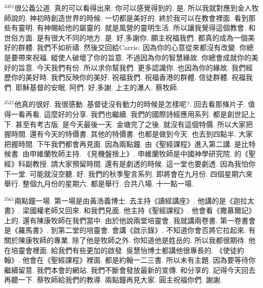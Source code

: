\documentclass{book}
\begin{document}
$^{3481}$很公義公道.
真的可以看得出來.
你可以感覺得到的.
是.
所以我就對應到金人牧師說的.
神初時創造世界的時候.
一切都是美好的.
終於我可以在教會裡面.
看到那些有靈明.
有神賜給他的屬靈的.
就是風營的靈明生活.
所以讓我覺得這個教會.
和世俗方面.
是有很大不同的地方.
是.
好,多謝你.
願主祝福我們.
都真的成為一個美好的群體.
我們不如祈禱.
然後交回給Carrie.
因為你的心意從來都沒有改變.
你總是要帶來祝福.
縱使人破壞了你的旨意.
不過因為你的智慧緣故.
你總會成就你的美好的旨意.
今天我們有份.
所以求你幫我們.
更多認識你.
也因為你的緣故.
我們經歷你的美好時.
我們反映你的美好.
祝福我們.
祝福香港的群體.
信徒群體.
祝福我們.
耶穌基督的安眠.
阿們.
好,多謝.
上主的瀑人.
蔡牧師.

$^{3521}$他真的很好.
我很感動.
基督徒沒有動力的時候是怎樣呢?.
回去看那條片子.
值得一看再看.
這麼好的分享.
我們也繼續.
我們的國際詩經應用系列.
都是創世記上下.
甚至有考古版.
是今天最後一天.
金塘完了之後.
就沒有這個特價.
所以大家把握時間.
還有今天的特價書.
其他的特價書.
也都是做到今天.
也去到四點半.
大家把握時間.
下午我們都會再見面.
因為兩點鐘.
由《聖經課程》進入第二講.
是比特候書.
由申維蘭牧師主持.
《見機盤捨上》.
申維蘭牧師是中國神學研究院.
的《聖經》科副教授.
請大家預留時間.
還有是劇透的時候.
這一堂也要劇透.
因為我怕你下一堂.
可能就沒空聽.
好.
我們的秋季聖言系列.
即將會在九月份.
四個星期六來舉行.
整個九月份的星期六.
都是舉行.
合共八場.
十一點一場.

$^{3561}$兩點鐘一場.
第一場是由黃浩義博士.
去主持《讀經講座》.
他講的是《迦拉太書》.
梁國權老師又回來.
和我們見面.
他主持《聖經課程》.
他會看《撒慕爾記》上的.
還有陳康牧師在我們當中.
由於他說兩堂培靈會.
我就講兩卷書.
第一卷書會是《羅馬書》.
到第二堂的培靈會.
會講《啟示錄》.
不知道你會否將它拉起來.
有關於陳康牧師的專業.
除了他是牧師之外.
你知道他是姓岳的.
所以我都很期待.
他在培靈會裡面.
給我們有些更加的啟發.
吳慧怡博士都講他很專長的.
《使徒約翰》.
他會在《聖經課程》裡面.
都是約翰一二三書.
所以未有主題.
因為要等待你繼續留意.
我們本會的網站.
我們不斷會發放最新的宣傳.
和分享的.
記得今天回去再聽一下.
蔡牧師給我們的教導.
兩點鐘再見大家.
圓主祝福你們.
謝謝.
\newpage
\end{document}
